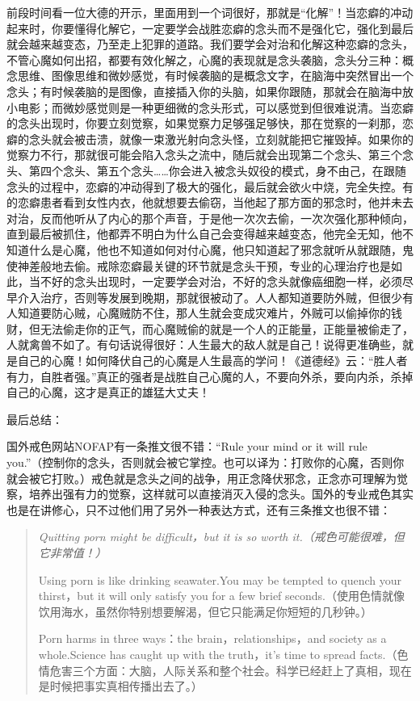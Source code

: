 前段时间看一位大德的开示，里面用到一个词很好，那就是“化解”！当恋癖的冲动起来时，你要懂得化解它，一定要学会战胜恋癖的念头而不是强化它，强化到最后就会越来越变态，乃至走上犯罪的道路。我们要学会对治和化解这种恋癖的念头，不管心魔如何出招，都要有效化解之，心魔的表现就是念头袭脑，念头分三种：概念思维、图像思维和微妙感觉，有时候袭脑的是概念文字，在脑海中突然冒出一个念头；有时候袭脑的是图像，直接插入你的头脑，如果你跟随，那就会在脑海中放小电影；而微妙感觉则是一种更细微的念头形式，可以感觉到但很难说清。当恋癖的念头出现时，你要立刻觉察，如果觉察力足够强足够快，那在觉察的一刹那，恋癖的念头就会被击溃，就像一束激光射向念头怪，立刻就能把它摧毁掉。如果你的觉察力不行，那就很可能会陷入念头之流中，随后就会出现第二个念头、第三个念头、第四个念头、第五个念头……你会进入被念头奴役的模式，身不由己，在跟随念头的过程中，恋癖的冲动得到了极大的强化，最后就会欲火中烧，完全失控。有的恋癖患者看到女性内衣，他就想要去偷窃，当他起了那方面的邪念时，他并未去对治，反而他听从了内心的那个声音，于是他一次次去偷，一次次强化那种倾向，直到最后被抓住，他都弄不明白为什么自己会变得越来越变态，他完全无知，他不知道什么是心魔，他也不知道如何对付心魔，他只知道起了邪念就听从就跟随，鬼使神差般地去偷。戒除恋癖最关键的环节就是念头干预，专业的心理治疗也是如此，当不好的念头出现时，一定要学会对治，不好的念头就像癌细胞一样，必须尽早介入治疗，否则等发展到晚期，那就很被动了。人人都知道要防外贼，但很少有人知道要防心贼，心魔贼防不住，那人生就会变成灾难片，外贼可以偷掉你的钱财，但无法偷走你的正气，而心魔贼偷的就是一个人的正能量，正能量被偷走了，人就禽兽不如了。有句话说得很好：人生最大的敌人就是自己！说得更准确些，就是自己的心魔！如何降伏自己的心魔是人生最高的学问！《道德经》云：“胜人者有力，自胜者强。”真正的强者是战胜自己心魔的人，不要向外杀，要向内杀，杀掉自己的心魔，这才是真正的雄猛大丈夫！

最后总结：

国外戒色网站NOFAP有一条推文很不错：“Rule your mind or it will rule you.”（控制你的念头，否则就会被它掌控。也可以译为：打败你的心魔，否则你就会被它打败。）戒色就是念头之间的战争，用正念降伏邪念，正念亦可理解为觉察，培养出强有力的觉察，这样就可以直接消灭入侵的念头。国外的专业戒色其实也是在讲修心，只不过他们用了另外一种表达方式，还有三条推文也很不错：

\begin{quotation}\it
    Quitting porn might be difficult，but it is so worth it.（戒色可能很难，但它非常值！）

    Using porn is like drinking seawater.You may be tempted to quench your thirst，but it will only satisfy you for a few brief seconds.（使用色情就像饮用海水，虽然你特别想要解渴，但它只能满足你短短的几秒钟。）

    Porn harms in three ways：the brain，relationships，and society as a whole.Science has caught up with the truth，it's time to spread facts.（色情危害三个方面：大脑，人际关系和整个社会。科学已经赶上了真相，现在是时候把事实真相传播出去了。）
\end{quotation}


